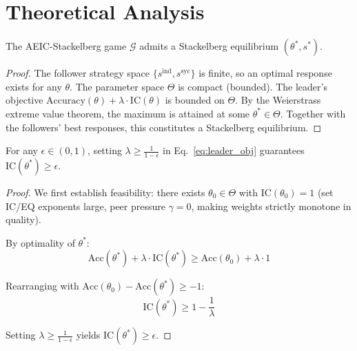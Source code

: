 \section{Theoretical Analysis}
\label{sec:theory}

\begin{theorem}
\label{thm:existence}
The AEIC-Stackelberg game $\mathcal{G}$ admits a Stackelberg equilibrium $(\theta^*, s^*)$.
\end{theorem}

\begin{proof}
The follower strategy space $\{s^{\text{ind}}, s^{\text{syc}}\}$ is finite, so an optimal response exists for any $\theta$. The parameter space $\Theta$ is compact (bounded). The leader's objective $\text{Accuracy}(\theta) + \lambda \cdot \text{IC}(\theta)$ is bounded on $\Theta$. By the Weierstrass extreme value theorem, the maximum is attained at some $\theta^* \in \Theta$. Together with the followers' best responses, this constitutes a Stackelberg equilibrium.
\end{proof}

\begin{theorem}
\label{thm:ic}
For any $\epsilon \in (0,1)$, setting $\lambda \geq \frac{1}{1-\epsilon}$ in Eq.~\eqref{eq:leader_obj} guarantees $\text{IC}(\theta^*) \geq \epsilon$.
\end{theorem}

\begin{proof}
We first establish feasibility: there exists $\theta_0 \in \Theta$ with $\text{IC}(\theta_0) = 1$ (set IC/EQ exponents large, peer pressure $\gamma = 0$, making weights strictly monotone in quality).

By optimality of $\theta^*$:
\begin{equation}
    \text{Acc}(\theta^*) + \lambda \cdot \text{IC}(\theta^*) \geq \text{Acc}(\theta_0) + \lambda \cdot 1
\end{equation}

Rearranging with $\text{Acc}(\theta_0) - \text{Acc}(\theta^*) \geq -1$:
\begin{equation}
    \text{IC}(\theta^*) \geq 1 - \frac{1}{\lambda}
\end{equation}

Setting $\lambda \geq \frac{1}{1-\epsilon}$ yields $\text{IC}(\theta^*) \geq \epsilon$.
\end{proof}

